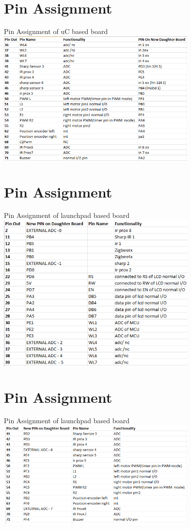 \documentclass[10pt, a4paper]{beamer}
\begin{document}
\section{Pin Assignment}
\begin{frame}{Pin Assignment of uC based board}
{\includegraphics[width=10cm]{2.PNG}}
\end{frame}
\section{Pin Assignment}
\begin{frame}{Pin Assignment of launchpad based board}
{\includegraphics[width=10cm]{3.PNG}}
\end{frame}
\section{Pin Assignment}
\begin{frame}{Pin Assignment of launchpad based board}
{\includegraphics[width=10cm]{4.PNG}}
\end{frame}
\end{document}
